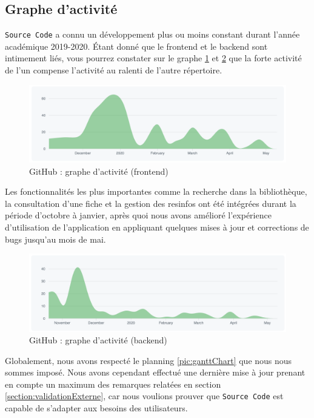 \subsection{Graphe d'activité}

\texttt{Source Code} a connu un développement plus ou moins constant durant l'année académique 2019-2020. Étant donné que le \gls{frontend} et le \gls{backend} sont intimement liés, vous pourrez constater sur le graphe \ref{figure:frontendActivity} et \ref{figure:backendActivity} que la forte activité de l'un compense l'activité au ralenti de l'autre répertoire.

\begin{figure}[H]
    \includegraphics[width=\textwidth,height=0.3\textheight,keepaspectratio]{images/analyseCritique/graph_frontend.png}
    \centering
    \caption{GitHub : graphe d'activité (frontend)}
    \label{figure:frontendActivity}
\end{figure}

Les fonctionnalités les plus importantes comme la recherche dans la bibliothèque, la consultation d'une \gls{fiche} et la gestion des \glspl{resinfo} ont été intégrées durant la période d'octobre à janvier, après quoi nous avons amélioré l'expérience d'utilisation de l'application en appliquant quelques mises à jour et corrections de bugs jusqu'au mois de mai.\\

\begin{figure}[H]
    \includegraphics[width=\textwidth,height=0.3\textheight,keepaspectratio]{images/analyseCritique/graph_backend.png}
    \centering
    \caption{GitHub : graphe d'activité (backend)}
    \label{figure:backendActivity}
\end{figure}


Globalement, nous avons respecté le planning \ref{pic:ganttChart} que nous nous sommes imposé. Nous avons cependant effectué une dernière mise à jour prenant en compte un maximum des remarques relatées en section \ref{section:validationExterne}, car nous voulions prouver que \texttt{Source Code} est capable de s'adapter aux besoins des utilisateurs.
